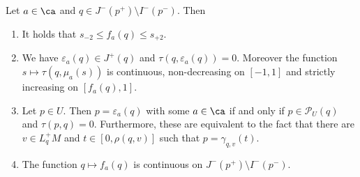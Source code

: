 \begin{lemma}\label{lem:observationtime}
Let $a\in \ca$ and $q \in J^-(p^+)\setminus I^-(p^-)$. Then
\begin{enumerate}[label={\textnormal{(\arabic*)}}]
    \item It holds that $s_{-2}\leq f_a(q) \leq s_{+2}$.
    \item We have $\varepsilon_a(q)\in J^+(q)$ and $\tau(q,\varepsilon_a(q))=0$. Moreover the function $s\mapsto\tau(q,\mu_a(s))$ is continuous, non-decreasing on $[-1,1]$ and strictly increasing on $[f_a(q),1]$.
    \item Let $p\in U$. Then $p=\varepsilon_a(q)$ with some $a\in \ca$ if and only if $p\in \mathcal{P}_U(q)$ and $\tau(p,q)=0$. Furthermore, these are equivalent to the fact that there are $v\in L^+_qM$ and $t\in[0,\rho(q,v)]$ such that $p=\gamma_{q,v}(t)$.
    \item The function $q\mapsto f_a(q)$ is continuous on $J^-(p^+)\setminus I^-(p^-)$.
\end{enumerate}
\end{lemma}
